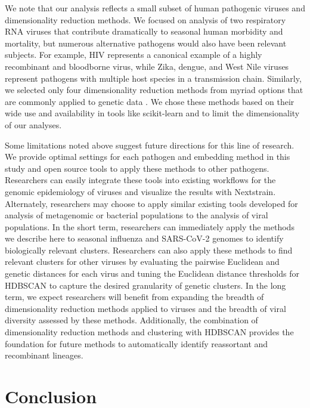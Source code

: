 \documentclass[10pt,letterpaper]{article}
\begin{document}
We note that our analysis reflects a small subset of human pathogenic viruses and dimensionality reduction methods.
We focused on analysis of two respiratory RNA viruses that contribute dramatically to seasonal human morbidity and mortality, but numerous alternative pathogens would also have been relevant subjects.
For example, HIV represents a canonical example of a highly recombinant and bloodborne virus, while Zika, dengue, and West Nile viruses represent pathogens with multiple host species in a transmission chain.
Similarly, we selected only four dimensionality reduction methods from myriad options that are commonly applied to genetic data \cite{Armstrong2022}.
We chose these methods based on their wide use and availability in tools like scikit-learn \cite{Pedregosa2011} and to limit the dimensionality of our analyses.

Some limitations noted above suggest future directions for this line of research.
We provide optimal settings for each pathogen and embedding method in this study and open source tools to apply these methods to other pathogens.
Researchers can easily integrate these tools into existing workflows for the genomic epidemiology of viruses and visualize the results with Nextstrain.
Alternately, researchers may choose to apply similar existing tools developed for analysis of metagenomic or bacterial populations \cite{Schloss2009,Schloss2020,Bolyen2019,McMurdie2013,Lees2019} to the analysis of viral populations.
In the short term, researchers can immediately apply the methods we describe here to seasonal influenza and SARS-CoV-2 genomes to identify biologically relevant clusters.
Researchers can also apply these methods to find relevant clusters for other viruses by evaluating the pairwise Euclidean and genetic distances for each virus and tuning the Euclidean distance thresholds for HDBSCAN to capture the desired granularity of genetic clusters.
In the long term, we expect researchers will benefit from expanding the breadth of dimensionality reduction methods applied to viruses and the breadth of viral diversity assessed by these methods.
Additionally, the combination of dimensionality reduction methods and clustering with HDBSCAN provides the foundation for future methods to automatically identify reassortant and recombinant lineages.

\section*{Conclusion}
\end{document}

